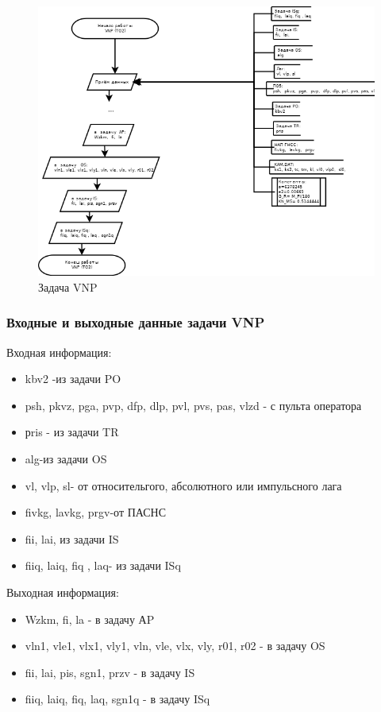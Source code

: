 \begin{figure}[H]
    \centering
    \includegraphics[width=0.75\linewidth]{images/VNP_simple.png}
    \caption{Задача VNP}
    \label{fig:VNP}
\end{figure}
\subsubsection{Входные и выходные данные задачи VNP}
Входная информация:
\begin{itemize}
\item kbv2 -из задачи  PO
\item psh, pkvz, pga,  pvp,  dfp, dlp, pvl, pvs, pas, vlzd - с пульта оператора
\item рris - из задачи  TR
\item alg-из задачи  OS
\item vl, vlp, sl- от относительгого, абсолютного или импульсного лага
\item fivkg,  lavkg,  prgv-от  ПАСНС
\item fii,  lai, из задачи IS
\item fiiq,  laiq, fiq , laq- из задачи ISq 
\end{itemize}
Выходная информация:
\begin{itemize}
\item Wzkm,  fi,  la - в  задачу  АP
\item vln1, vle1, vlx1, vly1, vln, vle, vlx, vly, r01, r02 - в  задачу   OS
\item fii, lai, pis, sgn1, przv - в задачу IS
\item fiiq, laiq, fiq, laq, sgn1q -  в задачу ISq  
\end{itemize}
